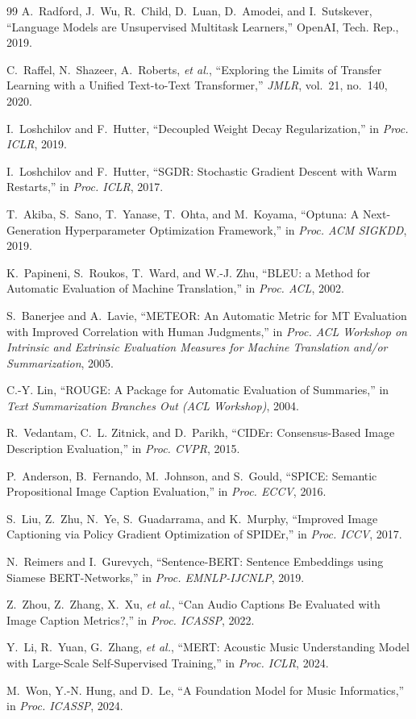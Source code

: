 \documentclass[9pt]{report}
\begin{document}
\begin{thebibliography}{99}
A.~Radford, J.~Wu, R.~Child, D.~Luan, D.~Amodei, and I.~Sutskever,
``Language Models are Unsupervised Multitask Learners,'' OpenAI, Tech. Rep., 2019.

C.~Raffel, N.~Shazeer, A.~Roberts, \emph{et al.},
``Exploring the Limits of Transfer Learning with a Unified Text-to-Text Transformer,''
\emph{JMLR}, vol.~21, no.~140, 2020.

I.~Loshchilov and F.~Hutter,
``Decoupled Weight Decay Regularization,'' in \emph{Proc. ICLR}, 2019.

I.~Loshchilov and F.~Hutter,
``SGDR: Stochastic Gradient Descent with Warm Restarts,'' in \emph{Proc. ICLR}, 2017.

T.~Akiba, S.~Sano, T.~Yanase, T.~Ohta, and M.~Koyama,
``Optuna: A Next-Generation Hyperparameter Optimization Framework,'' in \emph{Proc. ACM SIGKDD},
2019.

K.~Papineni, S.~Roukos, T.~Ward, and W.-J. Zhu,
``BLEU: a Method for Automatic Evaluation of Machine Translation,'' in \emph{Proc. ACL}, 2002.

S.~Banerjee and A.~Lavie,
``METEOR: An Automatic Metric for MT Evaluation with Improved Correlation with Human
Judgments,'' in \emph{Proc. ACL Workshop on Intrinsic and Extrinsic Evaluation Measures for
Machine Translation and/or Summarization}, 2005.

C.-Y. Lin,
``ROUGE: A Package for Automatic Evaluation of Summaries,'' in \emph{Text Summarization
Branches Out (ACL Workshop)}, 2004.

R.~Vedantam, C.~L. Zitnick, and D.~Parikh,
``CIDEr: Consensus-Based Image Description Evaluation,'' in \emph{Proc. CVPR}, 2015.

P.~Anderson, B.~Fernando, M.~Johnson, and S.~Gould,
``SPICE: Semantic Propositional Image Caption Evaluation,'' in \emph{Proc. ECCV}, 2016.

S.~Liu, Z.~Zhu, N.~Ye, S.~Guadarrama, and K.~Murphy,
``Improved Image Captioning via Policy Gradient Optimization of SPIDEr,'' in \emph{Proc. ICCV},
2017.

N.~Reimers and I.~Gurevych,
``Sentence-BERT: Sentence Embeddings using Siamese BERT-Networks,'' in \emph{Proc.
EMNLP-IJCNLP}, 2019.

Z.~Zhou, Z.~Zhang, X.~Xu, \emph{et al.},
``Can Audio Captions Be Evaluated with Image Caption Metrics?,'' in \emph{Proc. ICASSP}, 2022.

Y.~Li, R.~Yuan, G.~Zhang, \emph{et al.},
``MERT: Acoustic Music Understanding Model with Large-Scale Self-Supervised Training,'' in
\emph{Proc. ICLR}, 2024.

M.~Won, Y.-N. Hung, and D.~Le,
``A Foundation Model for Music Informatics,'' in \emph{Proc. ICASSP}, 2024.

\end{thebibliography}
\endgroup
\end{document}
